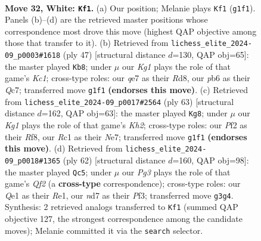 \documentclass[11pt]{article}
\begin{document}
\begin{figure}[p]
\label{fig:thought-m60}
\end{figure}

\clearpage

\begin{figure}[p]\centering
\begin{subfigure}{0.46\textwidth}\centering
\resizebox{\linewidth}{!}{%
\newchessgame
\chessboard[
  setfen={3r2k1/3nq1p1/rp3n2/3pp2p/P7/2N2NP1/2P2P1P/R1R1Q1K1 w - - 0 32},
  showmover=false,
  pgfstyle=straightmove, color=movearrow, markmove={g1-f1}
]}
\caption{}
\end{subfigure}\hfill
\begin{subfigure}{0.46\textwidth}\centering
\resizebox{\linewidth}{!}{%
\newchessgame
\chessboard[
  setfen={2kr4/1pq2p2/p1n1pnp1/2Pp4/N7/1PN5/P1P2PP1/1K1RQ3 b - - 10 24},
  showmover=false,
  pgfstyle=straightmove, color=movearrow, markmove={c8-b8}
]}
\caption{}
\end{subfigure}
\\[4pt]
\begin{subfigure}{0.46\textwidth}\centering
\resizebox{\linewidth}{!}{%
\newchessgame
\chessboard[
  setfen={5r2/1p2nrpk/1Pppp1qp/8/3PP2P/3QRNPn/2R2P1N/7K b - - 4 32},
  showmover=false,
  pgfstyle=straightmove, color=movearrow, markmove={h7-g8}
]}
\caption{}
\end{subfigure}\hfill
\begin{subfigure}{0.46\textwidth}\centering
\resizebox{\linewidth}{!}{%
\newchessgame
\chessboard[
  setfen={2br2k1/4qpp1/8/1p1np2p/1pn4P/1N1N1P2/PPP2QP1/1K1RR3 w - - 2 32},
  showmover=false,
  pgfstyle=straightmove, color=movearrow, markmove={f2-c5}
]}
\caption{}
\end{subfigure}
\caption{\textbf{Move 32, White: \texttt{Kf1}.} (a) Our position; Melanie plays \texttt{Kf1} (\texttt{g1f1}). Panels (b)--(d) are the retrieved master positions whose correspondence most drove this move (highest QAP objective among those that transfer to it). (b) Retrieved from \texttt{lichess\_elite\_2024-09\_p0003\#1618} (ply 47) [structural distance $d$=130, QAP obj=65]: the master played \texttt{Kb8}; under $\mu$ our \emph{Kg1} plays the role of that game's \emph{Kc1}; cross-type roles: our \emph{q}e7 as their \emph{R}d8, our \emph{p}b6 as their \emph{Q}c7; transferred move \texttt{g1f1} \textbf{(endorses this move)}. (c) Retrieved from \texttt{lichess\_elite\_2024-09\_p0017\#2564} (ply 63) [structural distance $d$=162, QAP obj=63]: the master played \texttt{Kg8}; under $\mu$ our \emph{Kg1} plays the role of that game's \emph{Kh2}; cross-type roles: our \emph{P}f2 as their \emph{R}f8, our \emph{R}c1 as their \emph{N}e7; transferred move \texttt{g1f1} \textbf{(endorses this move)}. (d) Retrieved from \texttt{lichess\_elite\_2024-09\_p0018\#1365} (ply 62) [structural distance $d$=160, QAP obj=98]: the master played \texttt{Qc5}; under $\mu$ our \emph{Pg3} plays the role of that game's \emph{Qf2} (a \textbf{cross-type} correspondence); cross-type roles: our \emph{Q}e1 as their \emph{R}e1, our \emph{n}d7 as their \emph{P}f3; transferred move \texttt{g3g4}. Synthesis: 2 retrieved analogs transferred to \texttt{Kf1} (summed QAP objective 127, the strongest correspondence among the candidate moves); Melanie committed it via the \texttt{search} selector.}

\end{figure}
\end{document}
